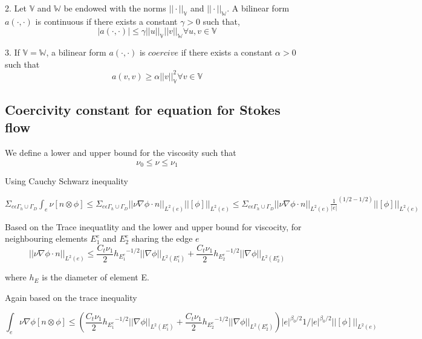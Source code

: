 \documentclass[a4paper,12pt]{book}
\begin{document}
2. Let $\mathbb{V}$ and $\mathbb{W}$ be endowed with the norms $||\cdot||_\mathbb{V}$ and $||\cdot||_\mathbb{W}$. A bilinear form $a(\cdot,\cdot)$ is continuous if there exists a constant $\gamma > 0$ such that,\\
\begin{equation}
|a(\cdot,\cdot)| \leq \gamma ||u||_\mathbb{V} ||v||_\mathbb{W} \forall u,v \in \mathbb{V}
\end{equation}

3. If $\mathbb{V} = \mathbb{W}$, a bilinear form $a(\cdot,\cdot)$ is $coercive$ if there exists a constant $\alpha > 0$ such that \\
\begin{equation}
a(v,v) \geq \alpha ||v||_\mathbb{V}^2 \forall v \in \mathbb{V}
\end{equation}

\subsection{Coercivity constant for equation for Stokes flow} \label{basics}

We define a lower and upper bound for the viscosity such that \\
\begin{equation}
\nu_0 \leq \nu \leq \nu_1
\end{equation}

Using Cauchy Schwarz inequality

$\Sigma_{e \epsilon \Gamma_h \cup \Gamma_D} \int_e {\nu}[n\otimes \phi] \leq \Sigma_{e \epsilon \Gamma_h \cup \Gamma_D} ||\nu \nabla \phi \cdot n||_{L^2(e)} ||[\phi]||_{L^2(e)} \leq \Sigma_{e \epsilon \Gamma_h \cup \Gamma_D} ||\nu \nabla \phi \cdot n||_{L^2(e)} {\frac{1}{|e|}}^{(1/2-1/2)} ||[\phi]||_{L^2(e)}$

Based on the Trace inequatlity and the lower and upper bound for viscocity, for neighbouring elements $E_1^e$ and $E_2^e$ sharing the edge $e$ 
\begin{equation}
||{\nu \nabla \phi \cdot n}||_{L^2(e)} \leq \frac{C_t \nu_1}{2} {h_{E_1^e}}^{-1/2} ||\nabla \phi||_{L^2(E_1^e)} + \frac{C_t \nu_1}{2} {h_{E_2^e}}^{-1/2} ||\nabla \phi||_{L^2(E_2^e)}
\end{equation}

where $h_E$ is the diameter of element E.

Again based on the trace inequality

\begin{equation}
\int_e {\nu \nabla \phi}[n \otimes \phi] \leq (\frac{C_t \nu_1}{2} {h_{E_1^e}}^{-1/2} ||\nabla \phi||_{L^2(E_1^e)} + \frac{C_t \nu_1}{2} {h_{E_2^e}}^{-1/2} ||\nabla \phi||_{L^2(E_2^e)}) |e|^{\beta_0/2} {1/|e|}^{\beta_0/2} ||[\phi]||_{L^2(e)}
\end{equation}
\end{document}
